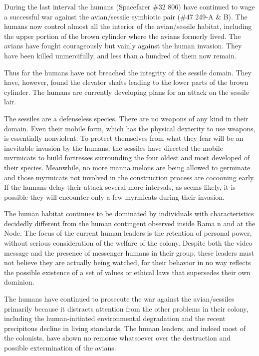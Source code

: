 \documentclass[]{article}
\begin{document}
{{During the last interval the humans (Spacefarer \#32 806) have continued to wage a successful war against the avian/sessile symbiotic pair (\#47 249-A \& B).  The humans now control almost all the interior of the avian/sessile habitat, including the upper portion of the brown cylinder where the avians formerly lived.  The avians have fought courageously but vainly against the human invasion.  They have been killed unmercifully, and less than a hundred of them now remain.

Thus far the humans have not breached the integrity of the sessile domain.  They have, however, found the elevator shafts leading to the lower parts of the brown cylinder.  The humans are currently developing plans for an attack on the sessile lair.

The sessiles are a defenseless species.  There are no weapons of any kind in their domain.  Even their mobile form, which has the physical dexterity to use weapons, is essentially nonviolent.  To protect themselves from what they fear will be an inevitable invasion by the humans, the sessiles have directed the mobile mvrmicats to build fortresses surrounding the four oldest and most developed of their species.  Meanwhile, no more manna melons are being allowed to germinate and those myrmicats not involved in the construction process are cocooning early.  If the humans delay their attack several more intervals, as seems likely, it is possible they will encounter only a few myrmicats during their invasion.

The human habitat continues to be dominated by individuals with characteristics decidedly different from the human contingent observed inside Rama n and at the Node.  The focus of the current human leaders is the retention of personal power, without serious consideration of the welfare of the colony.  Despite both the video message and the presence of messenger humans in their group, these leaders must not believe they are actually being watched, for their behavior in no way reflects the possible existence of a set of values or ethical laws that supersedes their own dominion.

The humans have continued to prosecute the war against the avian/sessiles primarily because it distracts attention from the other problems in their colony, including the human-initiated environmental degradation and the recent precipitous decline in living standards.  The human leaders, and indeed most of the colonists, have shown no remorse whatsoever over the destruction and possible extermination of the avians.

}}
\end{document}
